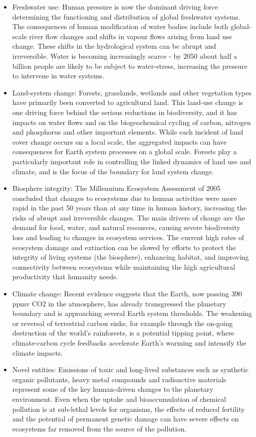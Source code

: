 \documentclass[
  12pt,
  oneside]{book}
\begin{document}
\begin{itemize}
\item
  Freshwater use: Human pressure is now the dominant driving force determining the functioning and distribution of global freshwater systems. The consequences of human modification of water bodies include both global-scale river flow changes and shifts in vapour flows arising from land use change. These shifts in the hydrological system can be abrupt and irreversible. Water is becoming increasingly scarce - by 2050 about half a billion people are likely to be subject to water-stress, increasing the pressure to intervene in water systems.
\item
  Land-system change: Forests, grasslands, wetlands and other vegetation types have primarily been converted to agricultural land. This land-use change is one driving force behind the serious reductions in biodiversity, and it has impacts on water flows and on the biogeochemical cycling of carbon, nitrogen and phosphorus and other important elements. While each incident of land cover change occurs on a local scale, the aggregated impacts can have consequences for Earth system processes on a global scale. Forests play a particularly important role in controlling the linked dynamics of land use and climate, and is the focus of the boundary for land system change.
\item
  Biosphere integrity: The Millennium Ecosystem Assessment of 2005 concluded that changes to ecosystems due to human activities were more rapid in the past 50 years than at any time in human history, increasing the risks of abrupt and irreversible changes. The main drivers of change are the demand for food, water, and natural resources, causing severe biodiversity loss and leading to changes in ecosystem services. The current high rates of ecosystem damage and extinction can be slowed by efforts to protect the integrity of living systems (the biosphere), enhancing habitat, and improving connectivity between ecosystems while maintaining the high agricultural productivity that humanity needs.
\item
  Climate change: Recent evidence suggests that the Earth, now passing 390 ppmv CO2 in the atmosphere, has already transgressed the planetary boundary and is approaching several Earth system thresholds. The weakening or reversal of terrestrial carbon sinks, for example through the on-going destruction of the world's rainforests, is a potential tipping point, where climate-carbon cycle feedbacks accelerate Earth's warming and intensify the climate impacts.
\item
  Novel entities: Emissions of toxic and long-lived substances such as synthetic organic pollutants, heavy metal compounds and radioactive materials represent some of the key human-driven changes to the planetary environment. Even when the uptake and bioaccumulation of chemical pollution is at sub-lethal levels for organisms, the effects of reduced fertility and the potential of permanent genetic damage can have severe effects on ecosystems far removed from the source of the pollution.
\end{itemize}
\end{document}
